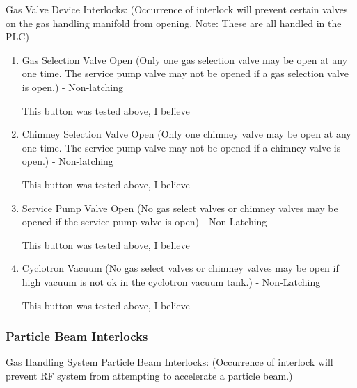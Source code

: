 \documentclass[11pt]{book}		%
\begin{document}
Gas Valve Device Interlocks:
(Occurrence of interlock will prevent certain valves on the gas handling manifold from opening. Note: These are all handled in the PLC)

\begin{enumerate}
 \item Gas Selection Valve Open (Only one gas selection valve may be open at any one time.  The service pump valve may not be opened if a gas selection valve is open.) - Non-latching

\color{red}
This button was tested above, I believe
\color{black}

 \item Chimney Selection Valve Open (Only one chimney valve may be open at any one time.  The service pump valve may not be opened if a chimney valve is open.) - Non-latching

\color{red}
This button was tested above, I believe
\color{black}

 \item Service Pump Valve Open (No gas select valves or chimney valves may be opened if the service pump valve is open) - Non-Latching

\color{red}
This button was tested above, I believe
\color{black}

 \item Cyclotron Vacuum  (No gas select valves or chimney valves may be open if high vacuum is not ok in the cyclotron vacuum tank.) - Non-Latching

\color{red}
This button was tested above, I believe
\color{black}

\end{enumerate}

\subsubsection{Particle Beam Interlocks}

Gas Handling System Particle Beam Interlocks:
(Occurrence of interlock will prevent RF system from attempting to accelerate a particle beam.)
\end{document}
